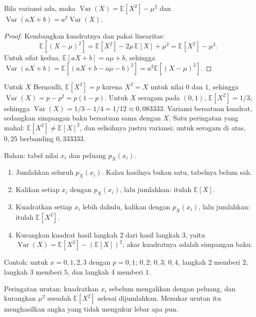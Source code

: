 \begin{proposisi}
Bila variansi ada, maka $\operatorname{Var}(X)=\mathbb{E}[X^2]-\mu^2$ dan
$\operatorname{Var}(aX+b)=a^2\operatorname{Var}(X)$.
\end{proposisi}

\begin{proof}
Kembangkan kuadratnya dan pakai linearitas:
\[
\mathbb{E}[(X-\mu)^2]=\mathbb{E}[X^2]-2\mu\,\mathbb{E}[X]+\mu^2
=\mathbb{E}[X^2]-\mu^2 .
\]
Untuk sifat kedua, $\mathbb{E}[aX+b]=a\mu+b$, sehingga
$\operatorname{Var}(aX+b)=\mathbb{E}[(aX+b-a\mu-b)^2]=a^2\mathbb{E}[(X-\mu)^2]$.
\end{proof}

Untuk $X$ Bernoulli, $\mathbb{E}[X^2]=p$ karena $X^2=X$ untuk nilai $0$ dan $1$,
sehingga $\operatorname{Var}(X)=p-p^2=p(1-p)$. Untuk $X$ seragam pada $(0,1)$,
$\mathbb{E}[X^2]=1/3$, sehingga $\operatorname{Var}(X)=1/3-1/4=1/12\approx0{,}083333$.
Variansi bersatuan kuadrat, sedangkan simpangan baku bersatuan sama dengan $X$. Satu
peringatan yang mahal: $\mathbb{E}[X^2]\ne\mathbb{E}[X]^2$, dan selisihnya justru
variansi; untuk seragam di atas, $0{,}25$ berbanding $0{,}333333$.

\begin{resep}
Bahan: tabel nilai $x_i$ dan peluang $p_X(x_i)$.
\begin{enumerate}
  \item Jumlahkan seluruh $p_X(x_i)$. Kalau hasilnya bukan satu, tabelnya belum sah.
  \item Kalikan setiap $x_i$ dengan $p_X(x_i)$, lalu jumlahkan: itulah $\mathbb{E}[X]$.
  \item Kuadratkan setiap $x_i$ lebih dahulu, kalikan dengan $p_X(x_i)$, lalu jumlahkan:
        itulah $\mathbb{E}[X^2]$.
  \item Kurangkan kuadrat hasil langkah 2 dari hasil langkah 3, yaitu
        $\operatorname{Var}(X)=\mathbb{E}[X^2]-(\mathbb{E}[X])^2$; akar kuadratnya
        adalah simpangan baku.
\end{enumerate}
Contoh: untuk $x=0,1,2,3$ dengan $p=0{,}1;\,0{,}2;\,0{,}3;\,0{,}4$, langkah 2 memberi
$2$, langkah 3 memberi $5$, dan langkah 4 memberi $1$.

Peringatan urutan: kuadratkan $x_i$ sebelum mengalikan dengan peluang, dan kurangkan
$\mu^2$ sesudah $\mathbb{E}[X^2]$ selesai dijumlahkan. Menukar urutan itu menghasilkan
angka yang tidak mengukur lebar apa pun.
\end{resep}


